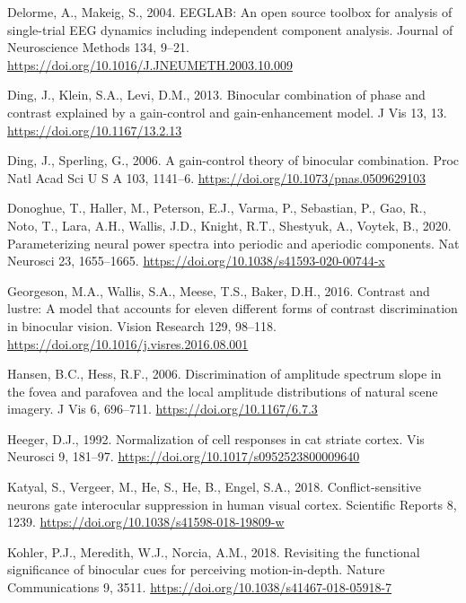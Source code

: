 \documentclass[
  12pt,
]{article}
\newlength{\cslhangindent}
\newenvironment{CSLReferences}[2] %
 {\begin{list}{}{%
  \setlength{\itemindent}{0pt}
  \setlength{\leftmargin}{0pt}
  \setlength{\parsep}{0pt}
  \ifodd #1
   \setlength{\leftmargin}{\cslhangindent}
   \setlength{\itemindent}{-1\cslhangindent}
  \fi
  \setlength{\itemsep}{#2\baselineskip}}}
 {\end{list}}
\begin{document}
\begin{CSLReferences}{1}{0}
Delorme, A., Makeig, S., 2004. EEGLAB: An open source toolbox for
analysis of single-trial EEG dynamics including independent component
analysis. Journal of Neuroscience Methods 134, 9--21.
\url{https://doi.org/10.1016/J.JNEUMETH.2003.10.009}

Ding, J., Klein, S.A., Levi, D.M., 2013. Binocular combination of phase
and contrast explained by a gain-control and gain-enhancement model. J
Vis 13, 13. \url{https://doi.org/10.1167/13.2.13}

Ding, J., Sperling, G., 2006. A gain-control theory of binocular
combination. Proc Natl Acad Sci U S A 103, 1141--6.
\url{https://doi.org/10.1073/pnas.0509629103}

Donoghue, T., Haller, M., Peterson, E.J., Varma, P., Sebastian, P., Gao,
R., Noto, T., Lara, A.H., Wallis, J.D., Knight, R.T., Shestyuk, A.,
Voytek, B., 2020. Parameterizing neural power spectra into periodic and
aperiodic components. Nat Neurosci 23, 1655--1665.
\url{https://doi.org/10.1038/s41593-020-00744-x}

Georgeson, M.A., Wallis, S.A., Meese, T.S., Baker, D.H., 2016. Contrast
and lustre: A model that accounts for eleven different forms of contrast
discrimination in binocular vision. Vision Research 129, 98--118.
\url{https://doi.org/10.1016/j.visres.2016.08.001}

Hansen, B.C., Hess, R.F., 2006. Discrimination of amplitude spectrum
slope in the fovea and parafovea and the local amplitude distributions
of natural scene imagery. J Vis 6, 696--711.
\url{https://doi.org/10.1167/6.7.3}

Heeger, D.J., 1992. Normalization of cell responses in cat striate
cortex. Vis Neurosci 9, 181--97.
\url{https://doi.org/10.1017/s0952523800009640}

Katyal, S., Vergeer, M., He, S., He, B., Engel, S.A., 2018.
Conflict-sensitive neurons gate interocular suppression in human visual
cortex. Scientific Reports 8, 1239.
\url{https://doi.org/10.1038/s41598-018-19809-w}

Kohler, P.J., Meredith, W.J., Norcia, A.M., 2018. Revisiting the
functional significance of binocular cues for perceiving
motion-in-depth. Nature Communications 9, 3511.
\url{https://doi.org/10.1038/s41467-018-05918-7}


\end{CSLReferences}
\end{document}
